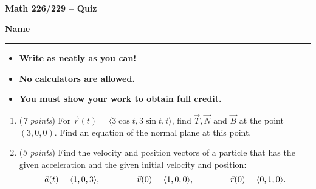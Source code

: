 \documentclass[12 pt]{article}
\begin{document}
  \begin{center}
    \textbf{\hfill Math 226/229 -- Quiz} \\
  \end{center}
  \medskip

  \noindent
  \textbf{Name}\ \rule{3.5in}{.4pt} \hfill
  \vspace{.1in}
  \hspace*{0.2in}
  \begin{itemize}
    \item \textbf{Write as neatly as you can!}
    \item \textbf{No calculators are allowed.}
    \item \textbf{You must show your work to obtain full credit.}
  \end{itemize}

	\medskip
  \noindent

  \begin{enumerate}
    \item (\textit{7 points})
    For $\vec r(t) = \langle 3\cos t, 3\sin t, t \rangle$, find
    $\overrightarrow T, \overrightarrow N$ and $\overrightarrow B$ at the point
    $(3,0,0)$. Find an equation of the normal plane at this point.
		\vspace{4in}
		\item (\textit{3 points})
		Find the velocity and position vectors of a particle that has the given
    acceleration and the given initial velocity and position: \[
      \vec a(t) = \langle 1, 0, 3 \rangle, \hspace{1.5cm}
      \vec v(0) = \langle 1, 0, 0 \rangle, \hspace{1.5cm}
      \vec r(0) = \langle 0, 1, 0 \rangle.
    \]
  \end{enumerate}
\end{document}
